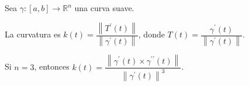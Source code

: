 \begin{frame}
    Sea $\gamma\colon\left[a,b\right]\to\mathbb{R}^{n}$ una curva
    suave.

    \begin{definition}[Curvatura]
        La \alert{curvatura} es
        \begin{math}
            k\left(t\right)=
            \dfrac{
                \left\|
                T^{\prime}\left(t\right)
                \right\|
            }{
                \left\|
                \gamma^{\prime}\left(t\right)
                \right\|
            }
        \end{math},
        donde
        \begin{math}
            T\left(t\right)=
            \dfrac{
                \gamma^{\prime}\left(t\right)
            }{
                \left\|
                \gamma^{\prime}\left(t\right)
                \right\|
            }
        \end{math}.
    \end{definition}

    \begin{theorem}
        Si $n=3$, entonces
        \begin{math}
            k\left(t\right)=
            \dfrac{
                \left\|
                \gamma^{\prime}\left(t\right)\times
                \gamma^{\prime\prime}\left(t\right)
                \right\|
            }{
                {\left\|
                        \gamma^{\prime}\left(t\right)
                        \right\|}^{3}
            }
        \end{math}.
    \end{theorem}


\end{frame}
